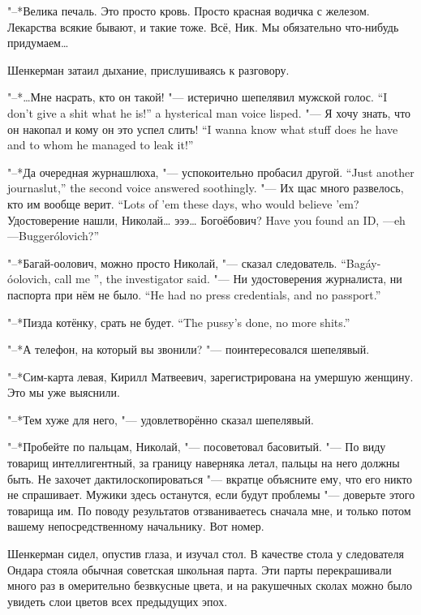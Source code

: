 "--*Велика печаль.
Это просто кровь.
Просто красная водичка с железом.
Лекарства всякие бывают, и такие тоже.
Всё, Ник.
Мы обязательно что-нибудь придумаем\dots{}

\asterism

Шенкерман затаил дыхание, прислушиваясь к разговору.

{"--*\dots{}Мне насрать, кто он такой! "--- истерично шепелявил мужской голос.}
{``I don't give a shit what he is!'' a hysterical man voice lisped.}
{"--- Я хочу знать, что он накопал и кому он это успел слить!}
{``I wanna know what stuff does he have and to whom he managed to leak it!''}

{"--*Да очередная журнашлюха, "--- успокоительно пробасил другой.}
{``Just another journaslut,'' the second voice answered soothingly.}
{"--- Их щас много развелось, кто им вообще верит.}
{``Lots of 'em these days, who would believe 'em?}
{Удостоверение нашли, Николай\dots{} эээ\dots{} Богоёбович?}
{Have you found an ID, \Nikolay---eh---Bugger\'olovich?''}

{"--*Багай-оолович, можно просто Николай, "--- сказал следователь.}
{``Bag\'ay-\'oolovich, call me \Nikolay'', the investigator said.}
{"--- Ни удостоверения журналиста, ни паспорта при нём не было.}
{``He had no press credentials, and no passport.''}

{"--*Пизда котёнку, срать не будет.}
{``The pussy's done, no more shits.''}

"--*А телефон, на который вы звонили? "--- поинтересовался шепелявый.

"--*Сим-карта левая, Кирилл Матвеевич, зарегистрирована на умершую женщину.
Это мы уже выяснили.

"--*Тем хуже для него, "--- удовлетворённо сказал шепелявый.

"--*Пробейте по пальцам, Николай, "--- посоветовал басовитый.
"--- По виду товарищ интеллигентный, за границу наверняка летал, пальцы на него должны быть.
Не захочет дактилоскопироваться "--- вкратце объясните ему, что его никто не спрашивает.
Мужики здесь останутся, если будут проблемы "--- доверьте этого товарища им.
По поводу результатов отзваниваетесь сначала мне, и только потом вашему непосредственному начальнику.
Вот номер.

\asterism

Шенкерман сидел, опустив глаза, и изучал стол.
В качестве стола у следователя Ондара стояла обычная советская школьная парта.
Эти парты перекрашивали много раз в омерительно безвкусные цвета, и на ракушечных сколах можно было увидеть слои цветов всех предыдущих эпох.

